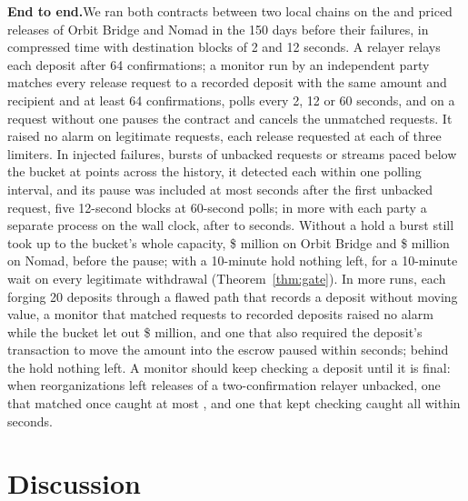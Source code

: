 \documentclass[conference,compsoc]{IEEEtran}
\numberwithin{equation}{section}
\theoremstyle{plain}
\theoremstyle{definition}
\theoremstyle{remark}
\newcommand{\runin}[1]{\par\smallskip\noindent\textbf{#1.}\enspace}
\begin{document}
\runin{End to end}We ran both contracts between two local chains on the \tbReleasesOrbit{} and \tbReleasesNomad{} priced releases of Orbit Bridge and Nomad in the 150 days before their failures, in compressed time with destination blocks of 2 and 12 seconds. A relayer relays each deposit after 64 confirmations; a monitor run by an independent party matches every release request to a recorded deposit with the same amount and recipient and at least 64 confirmations, polls every 2, 12 or 60 seconds, and on a request without one pauses the contract and cancels the unmatched requests. It raised no alarm on \tbLegitRequests{} legitimate requests, each release requested at each of three limiters. In \tbEpisodes{} injected failures, bursts of unbacked requests or streams paced below the bucket at points across the history, it detected each within one polling interval, and its pause was included at most \tbPauseMaxS{} seconds after the first unbacked request, five 12-second blocks at 60-second polls; in \tbRtEpisodes{} more with each party a separate process on the wall clock, after \tbRtPauseMinS{} to \tbRtPauseMaxS{} seconds. Without a hold a burst still took up to the bucket's whole capacity, \$\tbBurstOrbitM{} million on Orbit Bridge and \$\tbBurstNomadM{} million on Nomad, before the pause; with a 10-minute hold nothing left, for a 10-minute wait on every legitimate withdrawal (Theorem~\ref{thm:gate}). In \tbForgedN{} more runs, each forging 20 deposits through a flawed path that records a deposit without moving value, a monitor that matched requests to recorded deposits raised no alarm while the bucket let out \$\tbForgedRecordReleasedM{} million, and one that also required the deposit's transaction to move the amount into the escrow paused within \tbForgedPauseMaxS{} seconds; behind the hold nothing left. A monitor should keep checking a deposit until it is final: when reorganizations left \tbReorgTargets{} releases of a two-confirmation relayer unbacked, one that matched once caught at most \tbReorgOnceMax{}, and one that kept checking caught all within \tbReorgRecheckMaxS{} seconds.

\section{Discussion}\label{sec:discussion}
\end{document}

